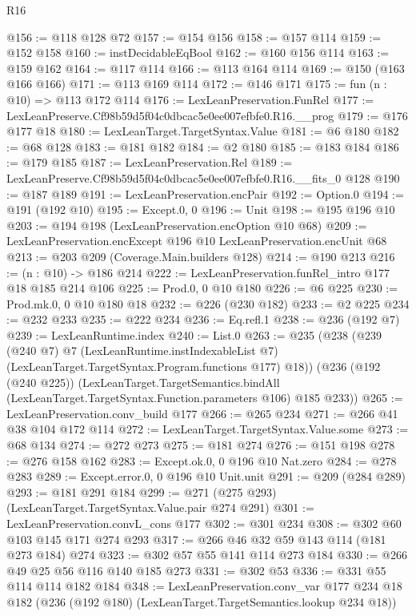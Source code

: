 \begin{lexlean}{R16}
\begin{coremodule}
@156 := @118 @128 @72
@157 := @154 @156
@158 := @157 @114
@159 := @152 @158
@160 := instDecidableEqBool
@162 := @160 @156 @114
@163 := @159 @162
@164 := @117 @114
@166 := @113 @164 @114
@169 := @150 (@163 @166 @166)
@171 := @113 @169 @114
@172 := @146 @171
@175 := fun (n : @10) => @113 @172 @114
@176 := LexLeanPreservation.FunRel
@177 := LexLeanPreserve.Cf98b59d5f04c0dbcac5e0ee007efbfe0.R16.__prog
@179 := @176 @177 @18
@180 := LexLeanTarget.TargetSyntax.Value
@181 := @6 @180
@182 := @68 @128
@183 := @181 @182
@184 := @2 @180
@185 := @183 @184
@186 := @179 @185
@187 := LexLeanPreservation.Rel
@189 := LexLeanPreserve.Cf98b59d5f04c0dbcac5e0ee007efbfe0.R16.__fits_0 @128
@190 := @187 @189
@191 := LexLeanPreservation.encPair
@192 := Option.{0}
@194 := @191 (@192 @10)
@195 := Except.{0, 0}
@196 := Unit
@198 := @195 @196 @10
@203 := @194 @198 (LexLeanPreservation.encOption @10 @68)
@209 := LexLeanPreservation.encExcept @196 @10 LexLeanPreservation.encUnit @68
@213 := @203 @209 (Coverage.Main.builders @128)
@214 := @190 @213
@216 := (n : @10) -> @186 @214
@222 := LexLeanPreservation.funRel_intro @177 @18 @185 @214 @106
@225 := Prod.{0, 0} @10 @180
@226 := @6 @225
@230 := Prod.mk.{0, 0} @10 @180 @18
@232 := @226 (@230 @182)
@233 := @2 @225
@234 := @232 @233
@235 := @222 @234
@236 := Eq.refl.{1}
@238 := @236 (@192 @7)
@239 := LexLeanRuntime.index
@240 := List.{0}
@263 := @235
    (@238
      (@239
        (@240 @7)
        @7
        (LexLeanRuntime.instIndexableList @7)
        (LexLeanTarget.TargetSyntax.Program.functions @177)
        @18))
    (@236
      (@192 (@240 @225))
      (LexLeanTarget.TargetSemantics.bindAll
        (LexLeanTarget.TargetSyntax.Function.parameters @106)
        @185
        @233))
@265 := LexLeanPreservation.conv_build @177
@266 := @265 @234
@271 := @266 @41 @38 @104 @172 @114
@272 := LexLeanTarget.TargetSyntax.Value.some
@273 := @68 @134
@274 := @272 @273
@275 := @181 @274
@276 := @151 @198
@278 := @276 @158 @162
@283 := Except.ok.{0, 0} @196 @10 Nat.zero
@284 := @278 @283
@289 := Except.error.{0, 0} @196 @10 Unit.unit
@291 := @209 (@284 @289)
@293 := @181 @291 @184
@299 := @271 (@275 @293) (LexLeanTarget.TargetSyntax.Value.pair @274 @291)
@301 := LexLeanPreservation.convL_cons @177
@302 := @301 @234
@308 := @302 @60 @103 @145 @171 @274 @293
@317 := @266 @46 @32 @59 @143 @114 (@181 @273 @184) @274
@323 := @302 @57 @55 @141 @114 @273 @184
@330 := @266 @49 @25 @56 @116 @140 @185 @273
@331 := @302 @53
@336 := @331 @55 @114 @114 @182 @184
@348 := LexLeanPreservation.conv_var
    @177
    @234
    @18
    @182
    (@236 (@192 @180) (LexLeanTarget.TargetSemantics.lookup @234 @18))

\end{coremodule}
\end{lexlean}
